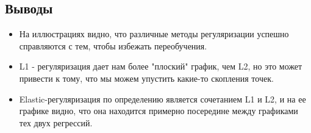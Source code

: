 \documentclass[a4paper,14pt,oneside,openany]{memoir}
\begin{document}
			\newpage
		\subsection{Выводы}
			\begin{itemize}
				\item На иллюстрациях видно, что различные методы регуляризации успешно справляются с тем, чтобы избежать переобучения.
				\item L1 - регуляризация дает нам более "плоский" график, чем L2, но это может привести к тому, что мы можем упустить какие-то скопления точек.
				\item Elastic-регуляризация по определению является сочетанием L1 и L2, и на ее графике видно, что она находится примерно посередине между графиками тех двух регрессий.
			\end{itemize}
	
\end{document}
